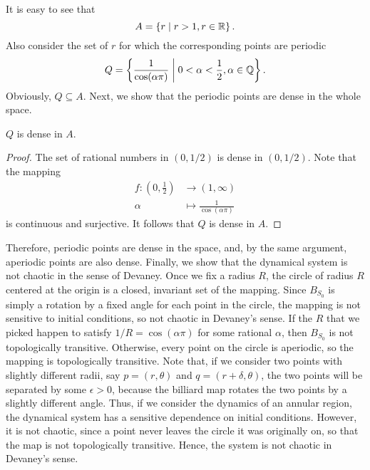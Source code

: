 \documentclass[12pt,twoside]{book}
\begin{document}
It is easy to see that
\begin{equation*}
  A = \left \{ r \mathrel{} \middle| \mathrel{} r > 1, r \in \mathbb{R} \right \}.
\end{equation*}
Also consider the set of $r$ for which the corresponding points are periodic
\begin{equation*}
  Q = \left \{ \frac{1}{\cos(\alpha\pi)} \mathrel{} \middle| \mathrel{} 0 < \alpha < \frac{1}{2}, \alpha \in \mathbb{Q} \right \}.
\end{equation*}
Obviously, $Q \subseteq A$.
Next, we show that the periodic points are dense in the whole space.
\begin{proposition}
  $Q$ is dense in $A$.
  \begin{proof}
  The set of rational numbers in $(0,1/2)$ is dense in $(0,1/2)$.
  Note that the mapping
    \begin{align*}
      f: (0,\frac{1}{2}) &\to (1, \infty)  \\
      \alpha &\mapsto \frac{1}{\cos(\alpha\pi)}
    \end{align*}
  is continuous and surjective.
  It follows that $Q$ is dense in $A$.
  \end{proof}
\end{proposition}
Therefore, periodic points are dense in the space, and, by the same argument, aperiodic points are also dense.
Finally, we show that the dynamical system is not chaotic in the sense of Devaney.
Once we fix a radius $R$, the circle of radius $R$ centered at the origin is a closed, invariant set of the mapping.
Since $B_{S_0}$ is simply a rotation by a fixed angle for each point in the circle, the mapping is not sensitive to initial conditions, so not chaotic in Devaney's sense.
If the $R$ that we picked happen to satisfy $1/R = \cos(\alpha\pi)$ for some rational $\alpha$, then $B_{S_0}$ is not topologically transitive.
Otherwise, every point on the circle is aperiodic, so the mapping is topologically transitive.
Note that, if we consider two points with slightly different radii, say $p = (r, \theta)$ and $q = (r + \delta, \theta)$, the two points will be separated by some $\epsilon > 0$, because the billiard map rotates the two points by a slightly different angle.
Thus, if we consider the dynamics of an annular region, the dynamical system has a sensitive dependence on initial conditions.
However, it is not chaotic, since a point never leaves the circle it was originally on, so that the map is not topologically transitive.
Hence, the system is not chaotic in Devaney's sense.
\end{document}
